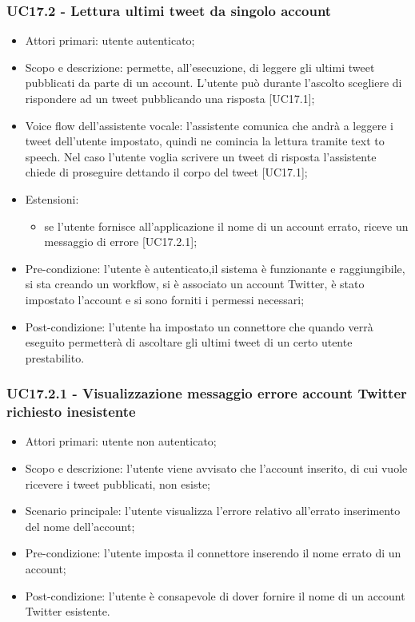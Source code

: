 \subsubsection{UC17.2 - Lettura ultimi tweet da singolo account}
\begin{itemize}
	\item  Attori primari: utente autenticato;
	\item  Scopo e descrizione: permette, all'esecuzione, di leggere gli ultimi tweet pubblicati da parte di un account. L'utente può durante l'ascolto scegliere di rispondere ad un tweet pubblicando una risposta [UC17.1];
	\item  Voice flow dell'assistente vocale: l'assistente comunica che andrà a leggere i tweet dell'utente impostato, quindi ne comincia la lettura tramite text to speech. Nel caso l'utente voglia scrivere un tweet di risposta l'assistente chiede di proseguire dettando il corpo del tweet [UC17.1];
	\item  Estensioni: 
		   \begin{itemize}
				\item se l'utente fornisce all'applicazione il nome di un account errato, riceve un messaggio di errore [UC17.2.1];
		   \end{itemize}
	\item  Pre-condizione: l'utente è autenticato,il sistema è funzionante e raggiungibile, si sta creando un workflow, si è associato un account Twitter, è stato impostato l'account e si sono forniti i permessi necessari;
	\item  Post-condizione: l'utente ha impostato un connettore che quando verrà eseguito permetterà di ascoltare gli ultimi tweet di un certo utente prestabilito.
\end{itemize}
\subsubsection{UC17.2.1 - Visualizzazione messaggio errore account Twitter richiesto inesistente}
\begin{itemize}
	\item  Attori primari: utente non autenticato;
	\item  Scopo e descrizione: l'utente viene avvisato che l'account inserito, di cui vuole ricevere i tweet pubblicati, non esiste;
	\item  Scenario principale: l'utente visualizza l'errore relativo all'errato inserimento del nome dell'account;
	\item  Pre-condizione: l'utente imposta il connettore inserendo il nome errato di un account;
	\item  Post-condizione: l'utente è consapevole di dover fornire il nome di un account Twitter esistente.
\end{itemize}
